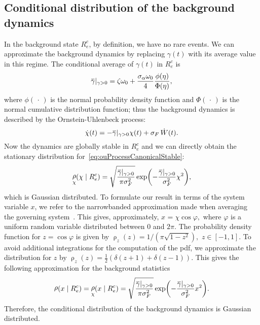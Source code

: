 \documentclass[3p]{elsarticle}
\newcommand{\overbar}[1]{\mkern 1mu\overline{\mkern-1mu#1\mkern-1mu}\mkern 1mu}
\DeclareMathOperator{\pdf}{\rho}
\newcommand{\blank}{\,\cdot\,}
\begin{document}
\subsection{Conditional distribution of the background dynamics}\label{sec:back_dyn}

In the background state  $R_e^c$, by definition, we have no rare events. We can approximate the background dynamics by  replacing $\gamma(t)$ with its  average value in this regime. The conditional average of $\gamma(t)$ in $R_e^c$ is  
\begin{equation}
 \overbar \gamma |_{\gamma>0} =   \zeta \omega_0 +   \frac{\sigma_{\alpha}\omega_0}{4}  \frac{\phi(\eta)}{\Phi(\eta)},
 \end{equation}
 where $\phi(\blank)$ is the normal probability density function and $\Phi(\blank)$ is the normal cumulative distribution function; thus the background dynamics is described by the Ornstein-Uhlenbeck process:
\begin{equation}\label{eq:ouProcessCanonicalStable}
\dot \chi (t) = - \overbar \gamma |_{\gamma>0} \chi(t)   +  \sigma_F \, \dot W(t).
\end{equation}
Now the dynamics are globally stable in $R_e^c$  and   we can directly obtain the stationary distribution for~\cref{eq:ouProcessCanonicalStable}:
\begin{equation}\label{eq:oustabresponse}
\pdf_{\chi}(\chi \mid R_e^c) = \sqrt{\frac{\overbar \gamma |_{\gamma>0}}{\pi \sigma_F^2 }} \exp \biggl({- \frac{\overbar \gamma |_{\gamma>0}}{\sigma_F^2}} \chi^2\biggr),
\end{equation}
which is Gaussian distributed. To formulate our result in terms of the system variable $x$, we refer to the narrowbanded approximation made when averaging the governing system~. This  gives, approximately, $x_{}=\chi \cos\varphi,$ where $\varphi$ is a uniform random variable distributed between 0 and $2\pi$. The probability density function for $z=\cos\varphi$ is given by $\pdf_{z}(z)= 1/(\pi\sqrt{1-z^{2}}),$ $z\in
[-1,1].$ To avoid additional integrations for the computation of the pdf, we approximate the distribution  for $z$ by $\pdf_{z}(z)=\frac{1}{2}(\delta(z+1)+\delta(z-1)).$
This   gives the following approximation for the background statistics
\begin{equation}\label{eq:eq_positio_unstable_oscillator}
\pdf(x \mid R_e^c)=\pdf_{\chi}(x \mid R_e^c)= \sqrt{\frac{\overbar \gamma |_{\gamma>0}}{\pi
\sigma_F^2 }} \exp \biggl({- \frac{\overbar \gamma |_{\gamma>0}}{\sigma_F^2}}
x^2\biggr).
\end{equation}Therefore, the  conditional distribution of the  background dynamics is     Gaussian distributed.
 
\end{document}
